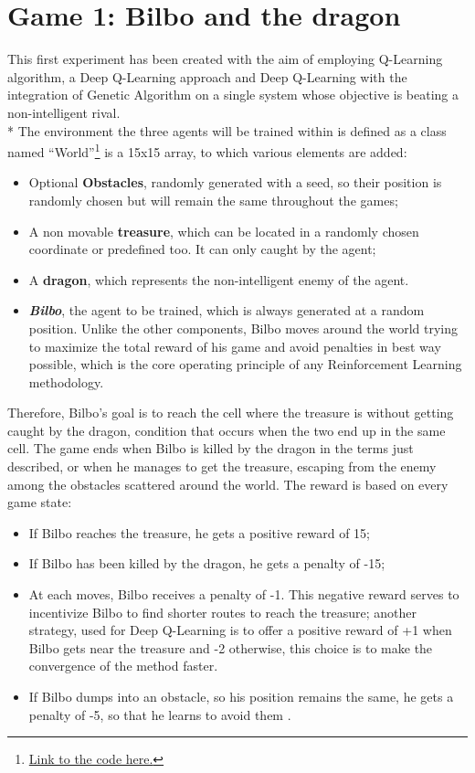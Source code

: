 \section{Game 1: Bilbo and the dragon}
This first experiment has been created with the aim of employing Q-Learning algorithm, a Deep Q-Learning approach and Deep Q-Learning with the integration of Genetic Algorithm on a single system whose objective is beating a non-intelligent rival.\\*
The environment the three agents will be trained within is defined as a class named ``World''\footnote{\href{https://github.com/moiraghif/DragonHunting/blob/master/Bilbo\%20World/CreateBilboWorld.py}{Link to the code here.}} is a 15x15 array, to which various elements are added:
\begin{itemize}[noitemsep, topsep=0ex]
  \item Optional \textbf{Obstacles}, randomly generated with a seed, so their position is randomly chosen but will remain the same throughout the games;
  \item A non movable \textbf{treasure}, which can be located in a randomly chosen coordinate or predefined too. It can only caught by the agent;
  \item A \textbf{dragon}, which represents the non-intelligent enemy of the agent.
  \item \textit{\textbf{Bilbo}}, the agent to be trained, which is always generated at a random position. Unlike the other components, Bilbo moves around the world trying to maximize the total reward of his game and avoid penalties in best way possible, which is the core operating principle of any Reinforcement Learning methodology.
\end{itemize}
Therefore, Bilbo's goal is to reach the cell where the treasure is without getting caught by the dragon, condition that occurs when the two end up in the same cell. The game ends when Bilbo is killed by the dragon in the terms just described, or when he manages to get the treasure, escaping from the enemy among the obstacles scattered around the world. The reward is based on every game state:
\begin{itemize}[noitemsep, topsep=0ex]
  \item If Bilbo reaches the treasure, he gets a positive reward of 15;
  \item If Bilbo has been killed by the dragon, he gets a penalty of -15;
  \item At each moves, Bilbo receives a penalty of -1. This negative reward serves to incentivize Bilbo to find shorter routes to reach the treasure; another strategy, used for Deep Q-Learning is to offer a positive reward of +1 when Bilbo gets near the treasure and -2 otherwise, this choice is to make the convergence of the method faster.
  \item If Bilbo dumps into an obstacle, so his position remains the same, he gets a penalty of -5, so that he learns to avoid them \cite{4}.
\end{itemize}
